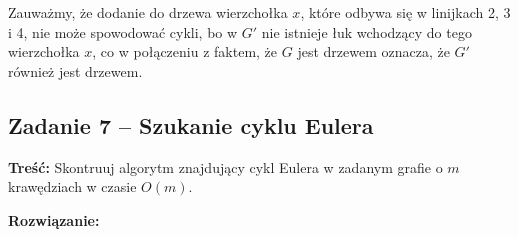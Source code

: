 Zauważmy, że dodanie do drzewa wierzchołka $x$, które odbywa się w linijkach 2, 3 i 4, nie może spowodować
cykli, bo w $G'$ nie istnieje łuk wchodzący do tego wierzchołka $x$, co w połączeniu z faktem, 
że $G$ jest drzewem oznacza, że $G'$ również jest drzewem.

\subsection{Zadanie 7 -- Szukanie cyklu Eulera}
\textbf{Treść: } Skontruuj algorytm znajdujący cykl Eulera 
w zadanym grafie o $m$ krawędziach w czasie $O(m)$.

\textbf{Rozwiązanie: }